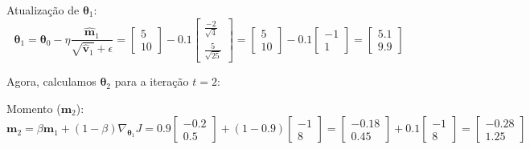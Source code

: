 \documentclass{dlproblemset}
\begin{document}
\begin{enumerate}[1)]
\begin{enumerate}
  Atualização de $\boldsymbol{\theta}_1$:
    $$\boldsymbol{\theta}_{1} = \boldsymbol{\theta}_{0} - \eta \frac{\hat{\mathbf{m}}_{1}}{\sqrt{\hat{\mathbf{v}}_{1}} + \epsilon} = \begin{bmatrix} 5\\ 10 \end{bmatrix} - 0.1\begin{bmatrix} \frac{-2}{\sqrt{4}}\\ \frac{5}{\sqrt{25}} \end{bmatrix} = \begin{bmatrix} 5\\ 10 \end{bmatrix} - 0.1\begin{bmatrix} -1\\ 1 \end{bmatrix} = \begin{bmatrix} 5.1\\ 9.9 \end{bmatrix}$$

Agora, calculamos $\boldsymbol{\theta}_{2}$ para a iteração $t=2$:

  Momento ($\mathbf{m}_2$):
    $$\mathbf{m}_{2} = \beta \mathbf{m}_{1} + (1-\beta )\nabla_{\boldsymbol{\theta}_{1}}J = 0.9\begin{bmatrix} -0.2\\ 0.5 \end{bmatrix} + (1-0.9)\begin{bmatrix} -1\\ 8 \end{bmatrix} = \begin{bmatrix} -0.18\\ 0.45 \end{bmatrix} + 0.1\begin{bmatrix} -1\\ 8 \end{bmatrix} = \begin{bmatrix} -0.28\\ 1.25 \end{bmatrix}$$


\end{enumerate}
\end{enumerate}
\end{document}
